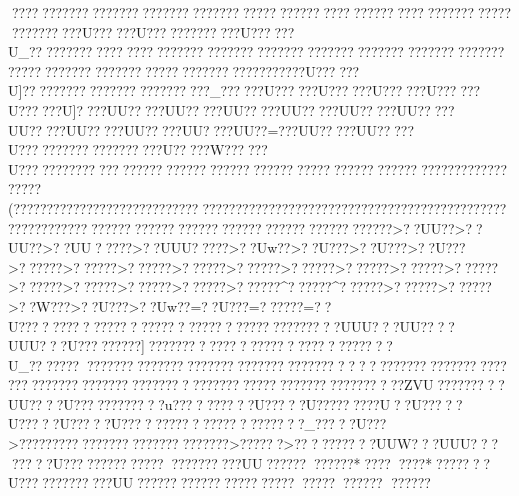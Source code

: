 {{{{{{{{{{{{{{{{{{{{{{{{{{{{{{{{{{{{{{{{{{{{{{{{{{{{{{{{{{{{{{{{{{{{{{{{{{{{{{{{{{{{{{{{{{{{{{{{{{{{{{{{{{{{{{{{{{{{{{{{{{{{{{{{{{{{{{{{{{{{{{{{{{{{{{{{{{{{{{{{{{{{{{{{{{{{{{{{{{{{{{{{{{{{{{{{{{{{{{{{{{{{{{{{{{{{{{{{{{{{{{{{{{{{{{{{{{{{{{{{{{{{{{{{{{{{{{{{{{{{{{{{{{{{{{{{{{{{{{{{{{{{{{{{{{{{{{{{{{{{{{{{{{{{{{{{{{{{{{{{{{{{{{{{{{{{{{{{{{{{{{{{{{{{{{{{{{{{{{{{{{{{{{{{{{{{{{{{{{{{{{{{{{{{{{{{{{{{{{{{{{{{{{{{{{{{{{{{{{{{{{{{{{{{{{{{{{{{{{{{{{{{{{{{{{{{{{{{{{{{{{{{{{{{{{{{{{{{{{{{{{{{{{{{{{{{{{{{{{{{{{{{{{{{{{{{{{{{{{{{{{{{{{{{{{{{{{{{{{{{{{{{{{{{{{{{{{{{{{{{{{{{{{{{{{{{{{{{{{{{{{{{{{{{{{{{{{{{{{{{{{{{{{{{{{{{{{{{{{{{{{{{{{{{{{{{{{{{{{{{{{{{{{{{{{{{{{{{{{{{{{{{{{{{{{{{{{{{{{{{{{{{{{{{{{{{{{{{{{{{{{{{{{{{{{{{{{{{{{{{{{{{{{{{{{{{{{{{{{{{{{{{{{{{{{{{{{{{{{{{{{{{{{{{{{{{{{{{{{{{{{{{{{{{{{{{{{{{{{{{{{{{{{{{{{{{{{{{{{{{{{{{{{{{{{{{{{{{{{{{{{{{{{{{{{{{{{{{{{{{{{{{{{{{{{{{{{{{{{{{{{{{{{{{{{{{{{{{{{{{{{{{{{{{{{{{{{{{{{{{{{{{{{{{{{{{{{{{{{{{{{{{{{{{{{{{{{{{{{{{{{{{{{{{{{{{{{{{{{{{{{{{{{{{{{{{{{{{{{{{{{{{{{{{{{{{{{{{{{{{{{{{{{{{{{{{{{{{{{{{{{{{{{{{{{{{{{{{{{{{{{{{{{{{{{{{{{{{{{{{{{{{{{{{{{{{{{{{{{{{{{{{{{{{{{{{{{{{{{{{{{{{{{{{{{{{{{{{{{{{{{{{{{{{{{{{{{{{{{{{{{{{{{{{{{{{{{{{{{{{{{{{{{{{{{{{{{{{{{{{{{{{{{{{{{{{{{{{{{{{{{{{{{{{{{{{{{{{{{{{{{{{{{{{{{{{{{{{{{{{{{{{{{{{{{{{{{{{{{{{{{{{{{{{{{{{{{{{{{{{{{{{{{ ????  ?????????????????????????????????  ?????? ????  ?????? ????  ??????????????????????U??????U?????????????U??????U_?????????????  ????  ???????????????????????????????????????????????????????????????????????????????????????????U??????U]??????????????????????????_??????U??????U??????U??????U??????U??????U]????UU?????UU?????UU?????UU?????UU?????UU?????UU?????UU?????UU?????UU????UU??=???UU?????UU?????U????????????????????U?????W??????U????????????  ?????????????????????????????????????????????????????????????( ?????? ?????????????????????? ???????????? ????????????????????????????????????????????????????????????????????????????????????????>??UU??>??UU??>??UU?????   >??UUU?????   >??Uw??>??U???>??U???>??U???>??????>??????>??????>??????>??????>??????>??????>??????>??????>??????>??????>??????>??????>??????^??????^??????>??????>??????>??W???>??U???>??Uw??=??U???=??????=??U????? ????????????????????????????????????UUU???UU????UUU???U?????????]???????????????????????????????U_??????? ?????????????????????????????????????    ??    ????????????????????????????????????????????????????????????????????????ZVU?????????UU????U????????????u????? ?????U?????U?????????U??U?????U?????U?????U???????????????????????_?????U???>??????????????????????????????>??????>?   ?????????UUW???UUU????????U????????? ????? ?????  ?????UU????????????*????  ????*  ?????  ??U????????  ?????UU?????? ?????? ?????  ????? ????? ??????
?????? }}}}}}}}}}}}}}}}}}}}}}}}}}}}}}}}}}}}}}}}}}}}}}}}}}}}}}}}}}}}}}}}}}}}}}}}}}}}}}}}}}}}}}}}}}}}}}}}}}}}}}}}}}}}}}}}}}}}}}}}}}}}}}}}}}}}}}}}}}}}}}}}}}}}}}}}}}}}}}}}}}}}}}}}}}}}}}}}}}}}}}}}}}}}}}}}}}}}}}}}}}}}}}}}}}}}}}}}}}}}}}}}}}}}}}}}}}}}}}}}}}}}}}}}}}}}}}}}}}}}}}}}}}}}}}}}}}}}}}}}}}}}}}}}}}}}}}}}}}}}}}}}}}}}}}}}}}}}}}}}}}}}}}}}}}}}}}}}}}}}}}}}}}}}}}}}}}}}}}}}}}}}}}}}}}}}}}}}}}}}}}}}}}}}}}}}}}}}}}}}}}}}}}}}}}}}}}}}}}}}}}}}}}}}}}}}}}}}}}}}}}}}}}}}}}}}}}}}}}}}}}}}}}}}}}}}}}}}}}}}}}}}}}}}}}}}}}}}}}}}}}}}}}}}}}}}}}}}}}}}}}}}}}}}}}}}}}}}}}}}}}}}}}}}}}}}}}}}}}}}}}}}}}}}}}}}}}}}}}}}}}}}}}}}}}}}}}}}}}}}}}}}}}}}}}}}}}}}}}}}}}}}}}}}}}}}}}}}}}}}}}}}}}}}}}}}}}}}}}}}}}}}}}}}}}}}}}}}}}}}}}}}}}}}}}}}}}}}}}}}}}}}}}}}}}}}}}}}}}}}}}}}}}}}}}}}}}}}}}}}}}}}}}}}}}}}}}}}}}}}}}}}}}}}}}}}}}}}}}}}}}}}}}}}}}}}}}}}}}}}}}}}}}}}}}}}}}}}}}}}}}}}}}}}}}}}}}}}}}}}}}}}}}}}}}}}}}}}}}}}}}}}}}}}}}}}}}}}}}}}}}}}}}}}}}}}}}}}}}}}}}}}}}}}}}}}}}}}}}}}}}}}}}}}}}}}}}}}}}}}}}}}}}}}}}}}}}}}}}}}}}}}}}}}}}}}}}}}}}}}}}}}}}}}}}}}}}}}}}}}}}}}}}}}}}}}}}}}}}}}}}}}}}}}}}}}}}}}}}}}}}}}}}}}}}}}}}}}}}}}}}}}}}}}}}}}}}}}}}}}}}}}}}}}}}}}}}}}}}}}}}}}}}}}}}}}}}}}}}}}}}}}}}}}}}}}}}}}}}}}}}}}}}}}}}}}}}}}}}}}}}}}}}}}}}}}}}}}}}}}}}}}}}}}}}}}}}}}}}}}}}}}}}}}}}}}}}}}}}}}}}}}}}}}}}}}}}}}}}}}}}}}}}}}}}}}}}}}}}}}}}}}}}}}}}}}}}}}}}}}}}}}}}}}}}}}}}}}}}}}}}}}}}
